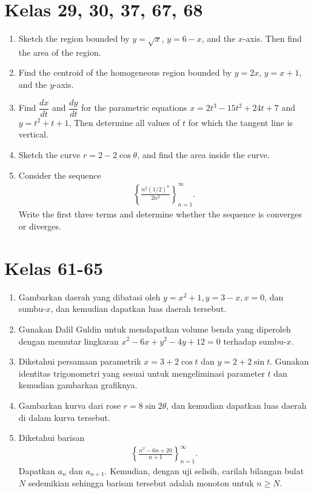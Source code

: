 \documentclass[10pt,openany,a4paper]{article}
\theoremstyle{definition}
\theoremstyle{definition}
\theoremstyle{plain}
\begin{document}
\section*{Kelas 29, 30, 37, 67, 68}
\begin{enumerate}
    \item Sketch the region bounded by $y=\sqrt{x}$, $y=6-x$, and the $x$-axis. Then find the area of the region.
    \item Find the centroid of the homogeneous region bounded by $y=2x$, $y=x+1$, and the $y$-axis.
    \item Find $\dfrac{dx}{dt}$ and $\dfrac{dy}{dt}$ for the parametric equations $x=2t^3-15t^2+24t+7$ and $y=t^2+t+1$, Then determine all values of $t$ for which the tangent line is vertical.
    \item Sketch the curve $r=2-2\cos\theta$, and find the area inside the curve.
    \item Consider the sequence
    \begin{align*}
        \left\{\frac{n^2(1/2)^n}{2n^2}\right\}_{n=1}^{\infty}.
    \end{align*}
    Write the first three terms and determine whether the sequence is converges or diverges.
\end{enumerate}
\section*{Kelas 61-65}
\begin{enumerate}
    \item Gambarkan daerah yang dibatasi oleh $y=x^2+1, y=3-x, x=0$, dan sumbu-$x$, dan kemudian dapatkan luas daerah tersebut.
    \item Gunakan Dalil Guldin untuk mendapatkan volume benda yang diperoleh dengan memutar lingkaran $x^2-6x+y^2-4y+12=0$ terhadap sumbu-$x$.
    \item Diketahui persamaan parametrik $x=3+2\cos t$ dan $y=2+2\sin t$. Gunakan identitas trigonometri yang sesuai untuk mengeliminasi parameter $t$ dan kemudian gambarkan grafiknya.
    \item Gambarkan kurva dari rose $r=8\sin2\theta$, dan kemudian dapatkan luas daerah di dalam kurva tersebut.
    \item Diketahui barisan
    \begin{align*}
        \left\{\frac{n^2-6n+20}{n+1}\right\}_{n=1}^{\infty}.
    \end{align*}
    Dapatkan $a_n$ dan $a_{n+1}$. Kemudian, dengan uji selisih, carilah bilangan bulat $N$ sedemikian sehingga barisan tersebut adalah monoton untuk $n\geq N$.
\end{enumerate}
\end{document}

